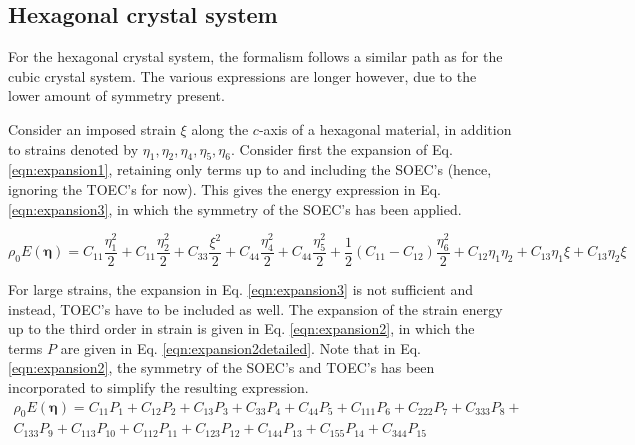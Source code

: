 \documentclass[showpacs,aps,floatfix,prb,reprint,superscriptaddress,onecolumn]{revtex4-1}
\begin{document}
\begin{enumerate}
\subsection{Hexagonal crystal system}
For the hexagonal crystal system, the formalism follows a similar path as for the cubic crystal system. The various expressions are longer however, due to the lower amount of symmetry present. 

Consider an imposed strain $\xi$ along the $c$-axis of a hexagonal material, in addition to strains denoted by $\eta_1, \eta_2, \eta_4, \eta_5, \eta_6$. Consider first the expansion of Eq. \ref{eqn:expansion1}, retaining only terms up to and including the SOEC's (hence, ignoring the TOEC's for now). This gives the energy expression in Eq. \ref{eqn:expansion3}, in which the symmetry of the SOEC's has been applied. 

\begin{equation}
\label{eqn:expansion3} 
\rho_{0} E \left(\bm{\eta}\right) = C_{11}\frac{\eta_{1}^2}{2} + C_{11}\frac{\eta_{2}^2}{2} +  C_{33}\frac{\xi^2}{2} + C_{44}\frac{\eta_{4}^2}{2} + C_{44}\frac{\eta_{5}^2}{2} + \frac{1}{2} \left(C_{11}-C_{12}\right)\frac{\eta_{6}^2}{2} + C_{12}\eta_{1}\eta_{2} + C_{13}\eta_{1}\xi + C_{13}\eta_{2}\xi
\end{equation}

For large strains, the expansion in Eq. \ref{eqn:expansion3} is not sufficient and instead, TOEC's have to be included as well. The expansion of the strain energy up to the third order in strain is given in Eq. \ref{eqn:expansion2}, in which the terms $P$ are given in Eq. \ref{eqn:expansion2detailed}. Note that in Eq. \ref{eqn:expansion2}, the symmetry of the SOEC's and TOEC's has been incorporated to simplify the resulting expression. 
\begin{multline}
\label{eqn:expansion2} 
\rho_{0} E \left(\bm{\eta}\right) = C_{11} P_{1} +  C_{12} P_{2} + C_{13} P_{3} + C_{33} P_{4} + C_{44} P_{5} + C_{111} P_{6} + C_{222} P_{7} + C_{333} P_{8} + \\ C_{133} P_{9} +  C_{113} P_{10} + C_{112} P_{11} + C_{123} P_{12} + C_{144} P_{13} + C_{155} P_{14} + C_{344} P_{15}
\end{multline}


\end{enumerate}
\end{document}
